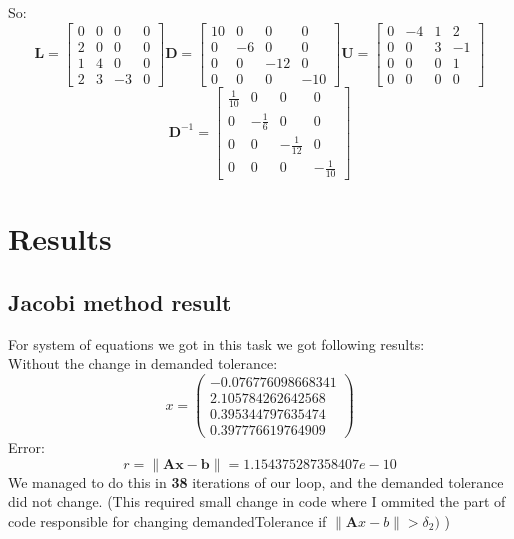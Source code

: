 \documentclass[12pt]{report}
\begin{document}
So:
\[
\textbf{L} = \begin{bmatrix}
0 & 0 & 0 & 0 \\
2 & 0 & 0 & 0 \\
1 & 4 & 0 & 0 \\
2 & 3 & -3 & 0
\end{bmatrix}
\textbf{D} = \begin{bmatrix}
10 & 0 & 0 & 0 \\
0 & -6 & 0 & 0 \\
0 & 0 & -12 & 0 \\
0 & 0 & 0 & -10
\end{bmatrix}
\textbf{U} = \begin{bmatrix}
0 & -4 & 1 & 2 \\
0 & 0 & 3 & -1 \\
0 & 0 & 0 & 1 \\
0 & 0 & 0 & 0
\end{bmatrix}
\]
\[
\textbf{D}^{-1} = \begin{bmatrix}
\frac{1}{10} & 0 & 0 & 0 \\
0 & - \frac{1}{6} & 0 & 0 \\
0 & 0 & - \frac{1}{12} & 0 \\
0 & 0 & 0 & - \frac{1}{10}
\end{bmatrix}
\]

\newpage
\section{Results}
\subsection{Jacobi method result}
For system of equations we got in this task we got following results:
\\
Without the change in demanded tolerance:
\[ x = \left( \begin{array}{cc}
  -0.076776098668341 \\
   2.105784262642568 \\
   0.395344797635474 \\
   0.397776619764909
\end{array} \right)
\]
Error:
\[ r = \| \mathbf{A}\mathbf{x} - \mathbf{b}\| = 1.154375287358407e-10 \]
We managed to do this in \textbf{38} iterations of our loop, and the demanded tolerance did not change. (This required small change in code where I ommited the part of code responsible for changing demandedTolerance if $ \| \mathbf{A}x-b \| > \delta_2) $ )
\end{document}

